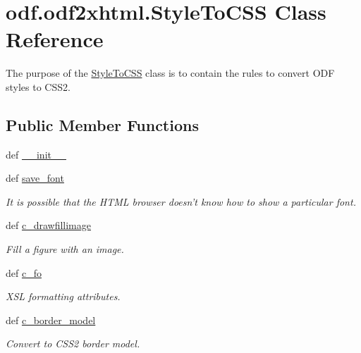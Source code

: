\hypertarget{classodf_1_1odf2xhtml_1_1StyleToCSS}{\section{odf.\+odf2xhtml.\+Style\+To\+C\+S\+S Class Reference}
\label{classodf_1_1odf2xhtml_1_1StyleToCSS}
}


The purpose of the \hyperlink{classodf_1_1odf2xhtml_1_1StyleToCSS}{Style\+To\+C\+S\+S} class is to contain the rules to convert O\+D\+F styles to C\+S\+S2.  


\subsection*{Public Member Functions}
\begin{DoxyCompactItemize}
\item 
def \hyperlink{classodf_1_1odf2xhtml_1_1StyleToCSS_a214c6b09e186940c35d887f21d8c973e}{\+\_\+\+\_\+init\+\_\+\+\_\+}
\item 
def \hyperlink{classodf_1_1odf2xhtml_1_1StyleToCSS_ade04405816e9c1910d3c838da3268e8f}{save\+\_\+font}
\begin{DoxyCompactList}\small\item\em It is possible that the H\+T\+M\+L browser doesn't know how to show a particular font. \end{DoxyCompactList}\item 
def \hyperlink{classodf_1_1odf2xhtml_1_1StyleToCSS_aa278feb4f768a5252db842a634e6aa40}{c\+\_\+drawfillimage}
\begin{DoxyCompactList}\small\item\em Fill a figure with an image. \end{DoxyCompactList}\item 
def \hyperlink{classodf_1_1odf2xhtml_1_1StyleToCSS_ac802a5289202cbcbc757a31058a64cba}{c\+\_\+fo}
\begin{DoxyCompactList}\small\item\em X\+S\+L formatting attributes. \end{DoxyCompactList}\item 
def \hyperlink{classodf_1_1odf2xhtml_1_1StyleToCSS_abe8f0fbde56352df58f27b77ec2b778c}{c\+\_\+border\+\_\+model}
\begin{DoxyCompactList}\small\item\em Convert to C\+S\+S2 border model. \end{DoxyCompactList}\item 

\end{DoxyCompactItemize}

